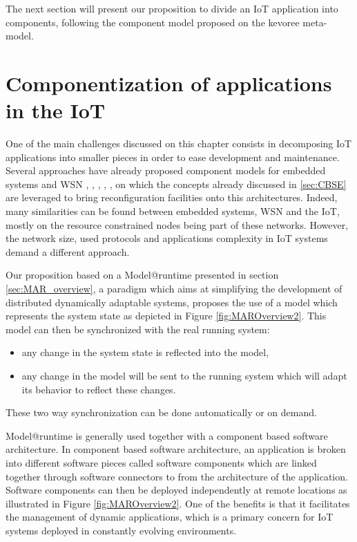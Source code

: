 The next section will present our proposition to divide an IoT application into components, following the component model proposed on the kevoree meta-model.


\section{Componentization of applications in the IoT}
One of the main challenges discussed on this chapter consists in decomposing IoT applications into smaller pieces in order to ease development and maintenance.
Several approaches have already proposed component models for embedded systems\cite{friedrich2001survey} and WSN \cite{marron2006flexcup}, \cite{grace2004gridkit}, \cite{mottola2008figaro}, \cite{cid2012looci}, \cite{taherkordi2013optimizing}, on which the concepts already discussed in \ref{sec:CBSE} are leveraged to bring reconfiguration facilities onto this architectures.
Indeed, many similarities can be found between embedded systems, WSN and the IoT, mostly on the resource constrained nodes being part of these networks.
However, the network size, used protocols and applications complexity in IoT systems demand a different approach.

Our proposition based on a Model@runtime\cite{morin2009mar} presented in section \ref{sec:MAR_overview}, a paradigm which aims at simplifying the development of distributed dynamically adaptable systems, proposes the use of a model which represents the system state as depicted in Figure \ref{fig:MAROverview2}. 
This model can then be synchronized with the real running system: 
\begin{itemize}
	\item any change in the system state is reflected into the model,
	\item any change in the model will be sent to the running system which will adapt its behavior to reflect these changes. 
\end{itemize}
These two way synchronization can be done automatically or on demand.

Model@runtime is generally used together with a component based software architecture.
In component based software architecture, an application is broken into different software pieces called software components which are linked together through software connectors \cite{dashofy2002infrastructure,medvidovic2000classification,van2000koala} to from the architecture of the application.
Software components can then be deployed independently at remote locations as illustrated in Figure \ref{fig:MAROverview2}. 
One of the benefits is that it facilitates the management of dynamic applications, which is a primary concern for IoT systems deployed in constantly evolving environments.

